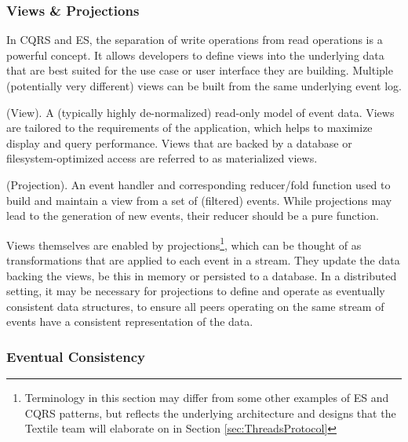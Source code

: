 \documentclass{textile}
\begin{document}
\subsubsection{Views \& Projections} \label{sec:ViewsProjections}

In CQRS and ES, the separation of write operations from read operations is a powerful concept. It allows developers to define views into the underlying data that are best suited for the use case or user interface they are building. Multiple (potentially very different) views can be built from the same underlying event log.

\begin{definition}
  (View). A (typically highly de-normalized) read-only model of event data. Views are tailored to the requirements of the application, which helps to maximize display and query performance. Views that are backed by a database or filesystem-optimized access are referred to as materialized views.
\end{definition}

\begin{definition}
  (Projection). An event handler and corresponding reducer/fold function used to build and maintain a view from a set of (filtered) events. While projections may lead to the generation of new events, their reducer should be a pure function.
\end{definition}

Views themselves are enabled by projections\footnote{Terminology in this section may differ from some other examples of ES and CQRS patterns, but reflects the underlying architecture and designs that the Textile team will elaborate on in Section \ref{sec:ThreadsProtocol}}, which can be thought of as transformations that are applied to each event in a stream. They update the data backing the views, be this in memory or persisted to a database. In a distributed setting, it may be necessary for projections to define and operate as eventually consistent data structures, to ensure all peers operating on the same stream of events have a consistent representation of the data.

\subsubsection{Eventual Consistency} \label{sec:EventualConsistency}
\end{document}
